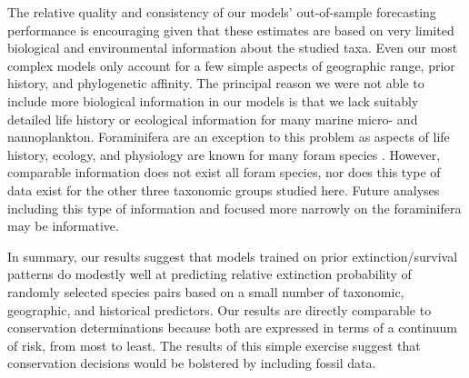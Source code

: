 \documentclass[12pt,letterpaper]{article}
\begin{document}
\begin{refsection}
The relative quality and consistency of our models' out-of-sample forecasting performance is encouraging given that these estimates are based on very limited biological and environmental information about the studied taxa. Even our most complex models only account for a few simple aspects of geographic range, prior history, and phylogenetic affinity. The principal reason we were not able to include more biological information in our models is that we lack suitably detailed life history or ecological information for many marine micro- and nannoplankton. Foraminifera are an exception to this problem as aspects of life history, ecology, and physiology are known for many foram species \citep{Ezard2011}. However, comparable information does not exist all foram species, nor does this type of data exist for the other three taxonomic groups studied here. Future analyses including this type of information and focused more narrowly on the foraminifera may be informative. 

In summary, our results suggest that models trained on prior extinction/survival patterns do modestly well at predicting relative extinction probability of randomly selected species pairs based on a small number of taxonomic, geographic, and historical predictors. Our results are directly comparable to conservation determinations because both are expressed in terms of a continuum of risk, from most to least. The results of this simple exercise suggest that conservation decisions would be bolstered by including fossil data.









\printbibliography
\end{refsection}
\clearpage
\end{document}
